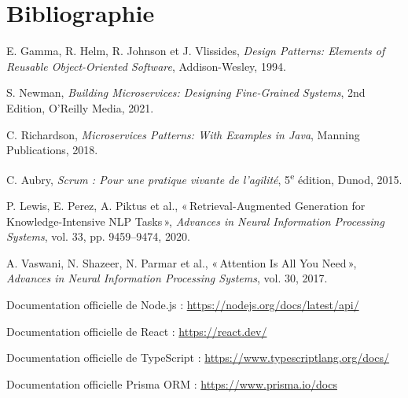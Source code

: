\renewcommand{\currentchapcolor}{black}
\chapter*{Bibliographie}

\begin{enumerate}[label={[\arabic*]},series=refs]

    \item E. Gamma, R. Helm, R. Johnson et J. Vlissides, \textit{Design Patterns: Elements of Reusable Object-Oriented Software}, Addison-Wesley, 1994.

    \item S. Newman, \textit{Building Microservices: Designing Fine-Grained Systems}, 2nd Edition, O'Reilly Media, 2021.

    \item C. Richardson, \textit{Microservices Patterns: With Examples in Java}, Manning Publications, 2018.

    \item C. Aubry, \textit{Scrum : Pour une pratique vivante de l'agilité}, 5\textsuperscript{e} édition, Dunod, 2015.

    \item P. Lewis, E. Perez, A. Piktus et al., «\,Retrieval-Augmented Generation for Knowledge-Intensive NLP Tasks\,», \textit{Advances in Neural Information Processing Systems}, vol. 33, pp. 9459--9474, 2020.

    \item A. Vaswani, N. Shazeer, N. Parmar et al., «\,Attention Is All You Need\,», \textit{Advances in Neural Information Processing Systems}, vol. 30, 2017.

    \item Documentation officielle de Node.js : \url{https://nodejs.org/docs/latest/api/}

    \item Documentation officielle de React : \url{https://react.dev/}

    \item Documentation officielle de TypeScript : \url{https://www.typescriptlang.org/docs/}

    \item Documentation officielle Prisma ORM : \url{https://www.prisma.io/docs}


\end{enumerate}
